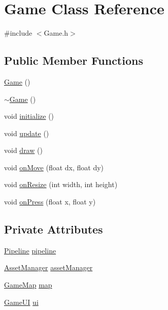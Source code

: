 \hypertarget{class_game}{}\section{Game Class Reference}
\label{class_game}


{\ttfamily \#include $<$Game.\+h$>$}

\subsection*{Public Member Functions}
\begin{DoxyCompactItemize}
\item 
\hyperlink{class_game_ad59df6562a58a614fda24622d3715b65}{Game} ()
\item 
\hyperlink{class_game_ae3d112ca6e0e55150d2fdbc704474530}{$\sim$\+Game} ()
\item 
void \hyperlink{class_game_a14073b7ee15e3a60b72112519be85453}{initialize} ()
\item 
void \hyperlink{class_game_a79df6376b332d63c9eca0dcee30305c3}{update} ()
\item 
void \hyperlink{class_game_a6d54497ce3a66f6dd45eacfdccc8d0bd}{draw} ()
\item 
void \hyperlink{class_game_a917775d182dc99ce4594caa198f9b07b}{on\+Move} (float dx, float dy)
\item 
void \hyperlink{class_game_a9555483a80e47a4d41b6eeafebeb0882}{on\+Resize} (int width, int height)
\item 
void \hyperlink{class_game_a298fe3c6527c1d0009be16692d28fc8b}{on\+Press} (float x, float y)
\end{DoxyCompactItemize}
\subsection*{Private Attributes}
\begin{DoxyCompactItemize}
\item 
\hyperlink{class_pipeline}{Pipeline} \hyperlink{class_game_a892521e52fc199340f33db5688d199b1}{pipeline}
\item 
\hyperlink{class_asset_manager}{Asset\+Manager} \hyperlink{class_game_a4617966fb0ab4c35025e2b1b3c262e9e}{asset\+Manager}
\item 
\hyperlink{class_game_map}{Game\+Map} \hyperlink{class_game_a45be81aaf550d2abb9ac4ba9a59d1036}{map}
\item 
\hyperlink{class_game_u_i}{Game\+UI} \hyperlink{class_game_a9c0a69f74dfc66b9af81efbce5e38e22}{ui}
\end{DoxyCompactItemize}


